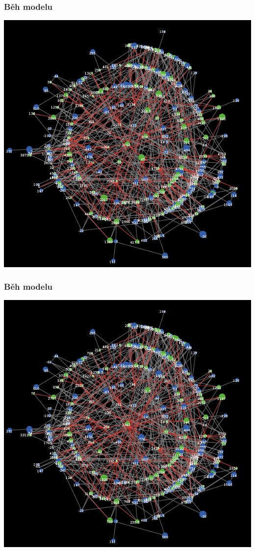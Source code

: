 \documentclass[xcolor=dvipsnames]{beamer}
\begin{document}
    \begin{frame}
    \frametitle{Běh modelu}
    \includegraphics[width=0.6\paperwidth]{10.png}
  \end{frame}
  \begin{frame}
    \frametitle{Běh modelu}
    \includegraphics[width=0.6\paperwidth]{11.png}
  \end{frame}
\end{document}
